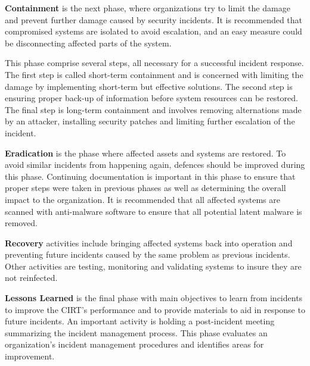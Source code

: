 \textbf{Containment} is the next phase, where organizations try to limit the damage and prevent further damage caused by security incidents. It is recommended that compromised systems are isolated to avoid escalation, and an easy measure could be disconnecting affected parts of the system. 

This phase comprise several steps, all necessary for a successful incident response. The first step is called short-term containment and is concerned with limiting the damage by implementing short-term but effective solutions. The second step is ensuring proper back-up of information before system resources can be restored. The final step is long-term containment and involves removing alternations made by an attacker, installing security patches and limiting further escalation of the incident.

\textbf{Eradication} is the phase where affected assets and systems are restored. To avoid similar incidents from happening again, defences should be improved during this phase. Continuing documentation is important in this phase to ensure that proper steps were taken in previous phases as well as determining the overall impact to the organization. It is recommended that all affected systems are scanned with anti-malware software to ensure that all potential latent malware is removed. 

\textbf{Recovery} activities include bringing affected systems back into operation and preventing future incidents caused by the same problem as previous incidents. Other activities are testing, monitoring and validating systems to insure they are not reinfected. 

\textbf{Lessons Learned} is the final phase with main objectives to learn from incidents to improve the CIRT's performance and to provide materials to aid in response to future incidents. An important activity is holding a post-incident meeting summarizing the incident management process. This phase evaluates an organization's incident management procedures and identifies areas for improvement.